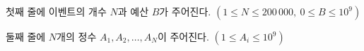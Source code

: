 첫째 줄에 이벤트의 개수 $N$과 예산 $B$가 주어진다.
$(1 \le N \le 200\,000,\ 0 \le B \le 10^9)$

둘째 줄에 $N$개의 정수 $A_1, A_2, \dots, A_N$이 주어진다.
$(1 \le A_i \le 10^9)$